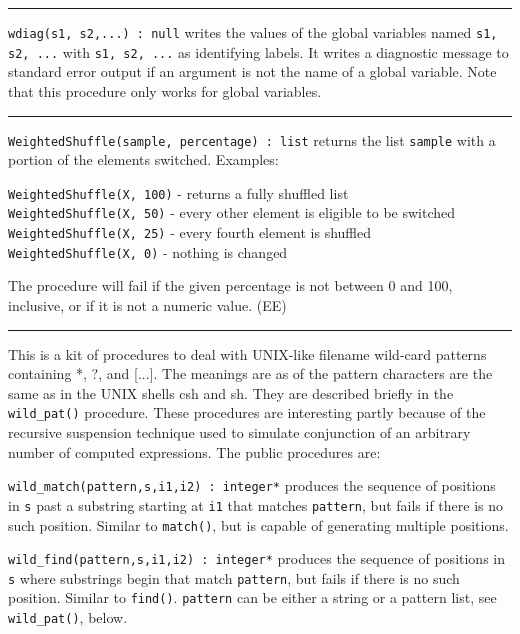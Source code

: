 \vspace{0.25cm}\hrule{}

\texttt{wdiag(s1, s2,...) : null} writes the values of the global
variables named \texttt{s1, s2, ...} with \texttt{s1, s2, ...} as
identifying labels. It writes a diagnostic message to standard error
output if an argument is not the name of a global variable. Note that
this procedure only works for global variables. 

\vspace{0.25cm}\hrule{}

\texttt{WeightedShuffle(sample, percentage) : list} returns the list
\texttt{sample} with a portion of the elements switched. Examples:

\texttt{WeightedShuffle(X, 100)} - returns a fully shuffled list\\
\texttt{WeightedShuffle(X, 50)} - every other element is eligible to be
switched\\
\texttt{WeightedShuffle(X, 25)} - every fourth element is
shuffled\\
\texttt{WeightedShuffle(X, 0)} - nothing is changed

The procedure will fail if the given percentage is not between 0 and
100, inclusive, or if it is not a numeric value. (EE)

\vspace{0.25cm}\hrule{}

This is a kit of procedures to deal with UNIX-like filename
wild-card patterns containing *, ?, and
[...]. The meanings are as of the pattern characters are the same as in
the UNIX shells csh and sh. They are described briefly in the
\texttt{wild\_pat()} procedure. These procedures are interesting partly
because of the {\textquotedbl}recursive suspension{\textquotedbl}
technique used to simulate conjunction of an arbitrary number of
computed expressions. The public procedures are:

\texttt{wild\_match(pattern,s,i1,i2) : integer*} produces the sequence
of positions in \texttt{s} past a substring starting at \texttt{i1}
that matches \texttt{pattern}, but fails if there is no such position.
Similar to \texttt{match()}, but is capable of generating multiple
positions.

\texttt{wild\_find(pattern,s,i1,i2) : integer*} produces the sequence of
positions in \texttt{s} where substrings begin that match
\texttt{pattern}, but fails if there is no such position. Similar to
\texttt{find()}. \texttt{pattern} can be either a string or a pattern
list, see \texttt{wild\_pat()}, below.

